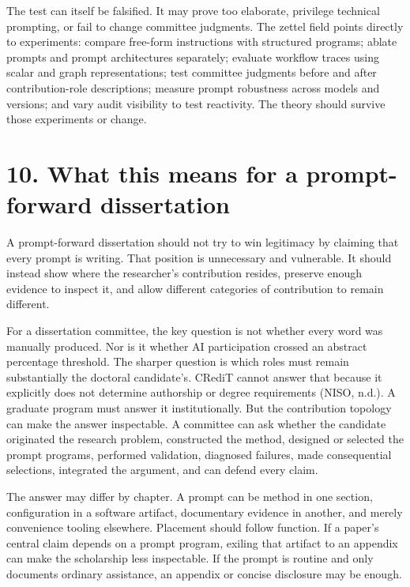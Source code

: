 \documentclass[
]{article}
\begin{document}
The test can itself be falsified. It may prove too elaborate, privilege
technical prompting, or fail to change committee judgments. The zettel
field points directly to experiments: compare free-form instructions
with structured programs; ablate prompts and prompt architectures
separately; evaluate workflow traces using scalar and graph
representations; test committee judgments before and after
contribution-role descriptions; measure prompt robustness across models
and versions; and vary audit visibility to test reactivity. The theory
should survive those experiments or change.

\section{10. What this means for a prompt-forward
dissertation}\label{what-this-means-for-a-prompt-forward-dissertation}

A prompt-forward dissertation should not try to win legitimacy by
claiming that every prompt is writing. That position is unnecessary and
vulnerable. It should instead show where the researcher's contribution
resides, preserve enough evidence to inspect it, and allow different
categories of contribution to remain different.

For a dissertation committee, the key question is not whether every word
was manually produced. Nor is it whether AI participation crossed an
abstract percentage threshold. The sharper question is which roles must
remain substantially the doctoral candidate's. CRediT cannot answer that
because it explicitly does not determine authorship or degree
requirements (NISO, n.d.). A graduate program must answer it
institutionally. But the contribution topology can make the answer
inspectable. A committee can ask whether the candidate originated the
research problem, constructed the method, designed or selected the
prompt programs, performed validation, diagnosed failures, made
consequential selections, integrated the argument, and can defend every
claim.

The answer may differ by chapter. A prompt can be method in one section,
configuration in a software artifact, documentary evidence in another,
and merely convenience tooling elsewhere. Placement should follow
function. If a paper's central claim depends on a prompt program,
exiling that artifact to an appendix can make the scholarship less
inspectable. If the prompt is routine and only documents ordinary
assistance, an appendix or concise disclosure may be enough.
\end{document}

